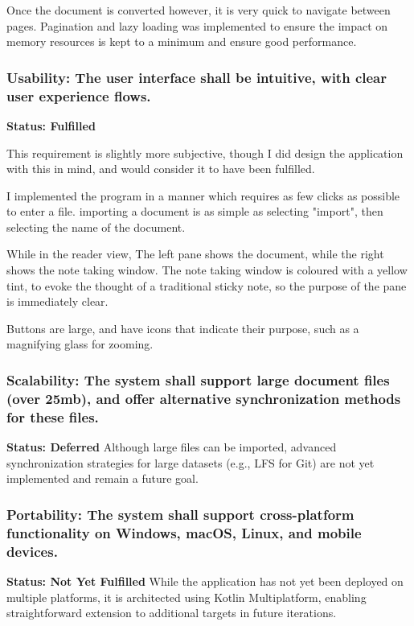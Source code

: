         Once the document is converted however, it is very quick to navigate between pages. Pagination and lazy loading was implemented to ensure the impact on memory resources is kept to a minimum and ensure good performance. 


        \subsubsection { Usability: The user interface shall be intuitive, with clear user experience flows. }
        \textbf{Status: Fulfilled}

        This requirement is slightly more subjective, though I did design the application with this in mind, and would consider it to have been fulfilled. 

        I implemented the program in a manner which requires as few clicks as possible to enter a file. importing a document is as simple as selecting "import", then selecting the name of the document. 

        While in the reader view, The left pane shows the document, while the right shows the note taking window. The note taking window is coloured with a yellow tint, to evoke the thought of a traditional sticky note, so the purpose of the pane is immediately clear. 

        Buttons are large, and have icons that indicate their purpose, such as a magnifying glass for zooming. 


        \subsubsection { Scalability: The system shall support large document files (over 25mb), and offer alternative synchronization methods for these files. }
        \textbf{Status: Deferred}
        Although large files can be imported, advanced synchronization strategies for large datasets (e.g., LFS for Git) are not yet implemented and remain a future goal.

        
        \subsubsection { Portability: The system shall support cross-platform functionality on Windows, macOS, Linux, and mobile devices.}        \textbf{Status: Not Yet Fulfilled}
        While the application has not yet been deployed on multiple platforms, it is architected using Kotlin Multiplatform, enabling straightforward extension to additional targets in future iterations.

